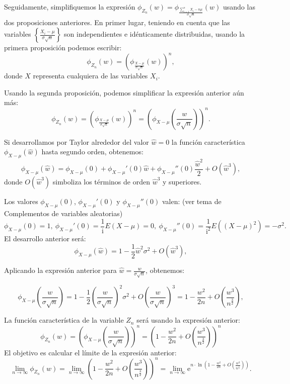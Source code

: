 \documentclass[]{book}
\begin{document}
Seguidamente, simplifiquemos la expresión \(\phi_{Z_n}(w)=\phi_{\frac{\sum\limits_{i=1}^n X_i-n\mu}{\sigma\sqrt{n}}}(w)\) usando las dos proposiciones anteriores. En primer lugar, teniendo en cuenta que las variables \(\left\{\frac{X_i-\mu}{\sigma\sqrt{n}}\right\}\) son independientes e idénticamente distribuidas, usando la primera proposición podemos escribir:
\[
\phi_{Z_n}(w) = \left(\phi_{\frac{X-\mu}{\sigma\sqrt{n}}}(w)\right)^n,
\]
donde \(X\) representa cualquiera de las variables \(X_i\).

Usando la segunda proposición, podemos simplificar la expresión anterior aún más:
\[
\phi_{Z_n}(w) = \left(\phi_{\frac{X-\mu}{\sigma\sqrt{n}}}(w)\right)^n = \left(\phi_{X-\mu}\left(\frac{w}{\sigma\sqrt{n}}\right)\right)^n.
\]

Si desarrollamos por Taylor alrededor del valor \(\hat{w}=0\) la función característica \(\phi_{X-\mu}\left(\hat{w}\right)\) hasta segundo orden, obtenemos:
\[
\phi_{X-\mu}\left(\hat{w}\right) = \phi_{X-\mu}\left(0\right)+ \phi_{X-\mu}'\left(0\right) \hat{w}+ \phi_{X-\mu}''\left(0\right)\frac{\hat{w}^2}{2}+O(\hat{w}^3),
\]
donde \(O(\hat{w}^3)\) simboliza los términos de orden \(\hat{w}^3\) y superiores.

Los valores \(\phi_{X-\mu}\left(0\right)\), \(\phi_{X-\mu}'\left(0\right)\) y \(\phi_{X-\mu}''\left(0\right)\) valen: (ver tema de Complementos de variables aleatorias)
\[
\phi_{X-\mu}\left(0\right)=1, \ \phi_{X-\mu}'\left(0\right)=\frac{1}{\mathrm{i}}E(X-\mu)=0,\ \phi_{X-\mu}''\left(0\right)=\frac{1}{\mathrm{i}^2}E\left((X-\mu)^2\right)=-\sigma^2.
\]
El desarrollo anterior será:
\[
\phi_{X-\mu}\left(\hat{w}\right) =1 - \frac{1}{2}\hat{w}^2\sigma^2+O(\hat{w}^3),
\]

Aplicando la expresión anterior para \(\hat{w}=\frac{w}{\sigma\sqrt{n}}\), obtenemos:

\[
\phi_{X-\mu}\left(\frac{w}{\sigma\sqrt{n}}\right) =1 - \frac{1}{2}\left(\frac{w}{\sigma\sqrt{n}}\right)^2\sigma^2+O\left(\frac{w}{\sigma\sqrt{n}}\right)^3= 1-\frac{w^2}{2n}+O\left(\frac{w^3}{n^{\frac{3}{2}}}\right),
\]

La función característica de la variable \(Z_n\) será usando la expresión anterior:
\[
\phi_{Z_n}(w)=\left(\phi_{X-\mu}\left(\frac{w}{\sigma\sqrt{n}}\right)\right)^n = \left(1-\frac{w^2}{2n}+O\left(\frac{w^3}{n^{\frac{3}{2}}}\right)\right)^n
\]
El objetivo es calcular el límite de la expresión anterior:
\[
\lim_{n\to \infty}\phi_{Z_n}(w) = \lim_{n\to\infty} \left(1-\frac{w^2}{2n}+O\left(\frac{w^3}{n^{\frac{3}{2}}}\right)\right)^n = 
\lim_{n\to \infty}\mathrm{e}^{n\cdot \ln \left(1-\frac{w^2}{2n}+O\left(\frac{w^3}{n^{\frac{3}{2}}}\right)\right)}.
\]
\end{document}
